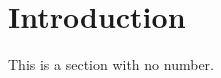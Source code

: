 \documentclass[12pt]{article}
\begin{document}
\section{Introduction}
This is a section with no number.
\end{document}
